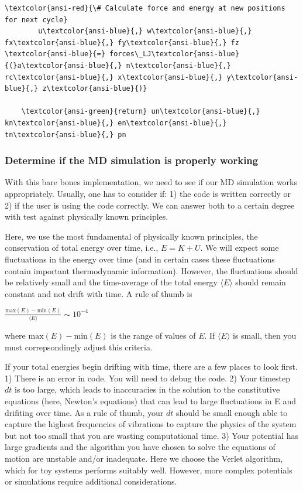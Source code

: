 \documentclass[11pt]{article}
\begin{document}
\begin{Verbatim}[commandchars=\\\{\}]
        \textcolor{ansi-red}{\# Calculate force and energy at new positions for next cycle}
        u\textcolor{ansi-blue}{,} w\textcolor{ansi-blue}{,} fx\textcolor{ansi-blue}{,} fy\textcolor{ansi-blue}{,} fz \textcolor{ansi-blue}{=} forces\_LJ\textcolor{ansi-blue}{(}a\textcolor{ansi-blue}{,} n\textcolor{ansi-blue}{,} rc\textcolor{ansi-blue}{,} x\textcolor{ansi-blue}{,} y\textcolor{ansi-blue}{,} z\textcolor{ansi-blue}{)}

    \textcolor{ansi-green}{return} un\textcolor{ansi-blue}{,} kn\textcolor{ansi-blue}{,} en\textcolor{ansi-blue}{,} tn\textcolor{ansi-blue}{,} pn

    \end{Verbatim}

    
    \hypertarget{determine-if-the-md-simulation-is-properly-working}{%
\subsubsection{Determine if the MD simulation is properly
working}\label{determine-if-the-md-simulation-is-properly-working}}

With this bare bones implementation, we need to see if our MD simulation
works appropriately. Usually, one has to consider if: 1) the code is
written correctly or 2) if the user is using the code correctly. We can
answer both to a certain degree with test against physically known
principles.

Here, we use the most fundamental of physically known principles, the
conservation of total energy over time, i.e., \(E = K+U\). We will
expect some fluctuations in the energy over time (and in certain cases
these fluctuations contain important thermodynamic information).
However, the fluctuations should be relatively small and the
time-average of the total energy \(\langle E \rangle\) should remain
constant and not drift with time. A rule of thumb is

\(\frac{\text{max}(E) - \text{min}(E)}{\langle E \rangle} \sim 10^{-4}\)

where \(\text{max}(E) - \text{min}(E)\) is the range of values of \(E\).
If \(\langle E \rangle\) is small, then you must correpsondingly adjust
this criteria.

If your total energies begin drifting with time, there are a few places
to look first. 1) There is an error in code. You will need to debug the
code. 2) Your timestep \(dt\) is too large, which leads to inaccuracies
in the solution to the constitutive equations (here, Newton's equations)
that can lead to large fluctuations in E and drifiting over time. As a
rule of thumb, your \(dt\) should be small enough able to capture the
highest frequencies of vibrations to capture the physics of the system
but not too small that you are wasting computational time. 3) Your
potential has large gradients and the algorithm you have chosen to solve
the equations of motion are unstable and/or inadequate. Here we choose
the Verlet algorithm, which for toy systems performs suitably well.
However, more complex potentials or simulations require additional
considerations.
\end{document}
